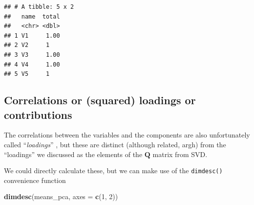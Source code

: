 \documentclass[
]{book}
\newenvironment{Shaded}{\begin{snugshade}}{\end{snugshade}}
\newcommand{\AttributeTok}[1]{\textcolor[rgb]{0.13,0.29,0.53}{#1}}
\newcommand{\CommentTok}[1]{\textcolor[rgb]{0.56,0.35,0.01}{\textit{#1}}}
\newcommand{\DecValTok}[1]{\textcolor[rgb]{0.00,0.00,0.81}{#1}}
\newcommand{\FunctionTok}[1]{\textcolor[rgb]{0.13,0.29,0.53}{\textbf{#1}}}
\newcommand{\NormalTok}[1]{#1}
\newcommand{\SpecialCharTok}[1]{\textcolor[rgb]{0.81,0.36,0.00}{\textbf{#1}}}
\begin{document}
\begin{Shaded}
\end{Shaded}

\begin{verbatim}
## # A tibble: 5 x 2
##   name  total
##   <chr> <dbl>
## 1 V1     1.00
## 2 V2     1   
## 3 V3     1.00
## 4 V4     1.00
## 5 V5     1
\end{verbatim}

\subsection{Correlations or (squared) loadings or contributions}\label{correlations-or-squared-loadings-or-contributions}

The correlations between the variables and the components are also unfortunately called ``\emph{loadings}'' \citep[cf.][ for more info]{abdiPrincipal2010}, but these are distinct (although related, argh) from the ``loadings'' we discussed as the elements of the \(\mathbf Q\) matrix from SVD.

We could directly calculate these, but we can make use of the \texttt{dimdesc()} convenience function

\begin{Shaded}
\begin{Highlighting}[]
\FunctionTok{dimdesc}\NormalTok{(means\_pca, }\AttributeTok{axes =} \FunctionTok{c}\NormalTok{(}\DecValTok{1}\NormalTok{, }\DecValTok{2}\NormalTok{))}
\end{Highlighting}
\end{Shaded}
\end{document}
